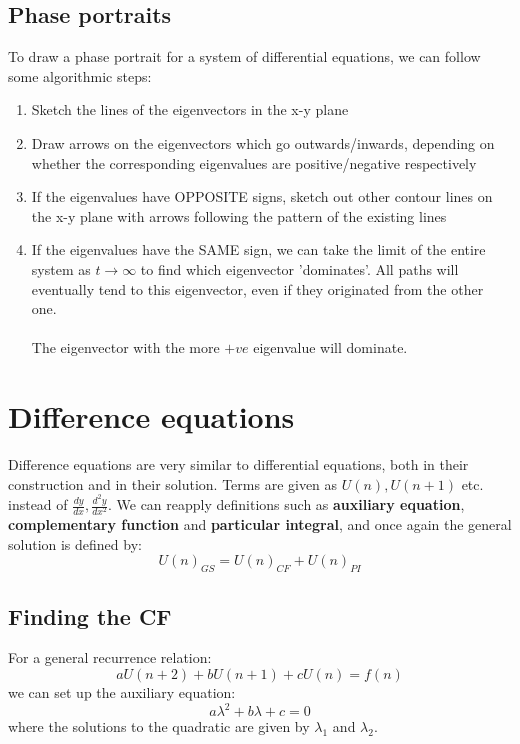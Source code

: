 \documentclass{scrartcl}
\begin{document}
\subsection{Phase portraits}

To draw a phase portrait for a system of differential equations, we can follow some algorithmic steps:
\begin{enumerate}
\item Sketch the lines of the eigenvectors in the x-y plane
\item Draw arrows on the eigenvectors which go outwards/inwards, depending on whether the corresponding eigenvalues are positive/negative respectively
\item If the eigenvalues have OPPOSITE signs, sketch out other contour lines on the x-y plane with arrows following the pattern of the existing lines
\item If the eigenvalues have the SAME sign, we can take the limit of the entire system as $ t \to \infty $ to find which eigenvector 'dominates'. All paths will eventually tend to this eigenvector, even if they originated from the other one.
\\\\
The eigenvector with the more $ +ve $ eigenvalue will dominate.
\end{enumerate}

\section{Difference equations}

Difference equations are very similar to differential equations, both in their construction and in their solution. Terms are given as $ U(n), U(n+1) $ etc. instead of $ \frac{dy}{dx}, \frac{d^{2} y}{dx^{2}} $. We can reapply definitions such as \textbf{auxiliary equation}, \textbf{complementary function} and \textbf{particular integral}, and once again the general solution is defined by:
\begin{equation} \label{generalformdifference}
U(n)_{GS} = U(n)_{CF} + U(n)_{PI}
\end{equation}

\subsection{Finding the CF}

For a general recurrence relation:
\begin{equation}
aU(n+2) + bU(n+1) + cU(n) = f(n)
\end{equation}
we can set up the auxiliary equation:
\begin{equation}
a \lambda^{2} + b \lambda + c = 0
\end{equation}
where the solutions to the quadratic are given by $ \lambda_{1} $ and $ \lambda_{2} $.
\end{document}
